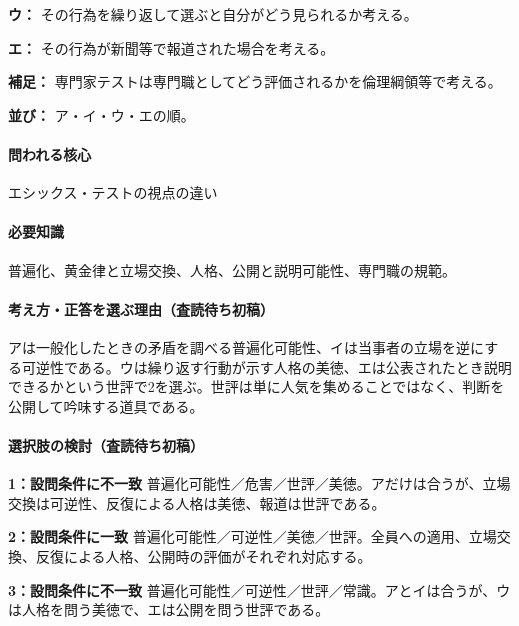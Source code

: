 \noindent\textbf{ウ：} その行為を繰り返して選ぶと自分がどう見られるか考える。\par

\noindent\textbf{エ：} その行為が新聞等で報道された場合を考える。\par

\noindent\textbf{補足：} 専門家テストは専門職としてどう評価されるかを倫理綱領等で考える。\par

\noindent\textbf{並び：} ア・イ・ウ・エの順。\par

\paragraph{問われる核心} エシックス・テストの視点の違い

\paragraph{必要知識} 普遍化、黄金律と立場交換、人格、公開と説明可能性、専門職の規範。

\paragraph{考え方・正答を選ぶ理由（査読待ち初稿）} アは一般化したときの矛盾を調べる普遍化可能性、イは当事者の立場を逆にする可逆性である。ウは繰り返す行動が示す人格の美徳、エは公表されたとき説明できるかという世評で2を選ぶ。世評は単に人気を集めることではなく、判断を公開して吟味する道具である。

\paragraph{選択肢の検討（査読待ち初稿）}\mbox{}\par

\noindent\textbf{1：設問条件に不一致} 普遍化可能性／危害／世評／美徳。アだけは合うが、立場交換は可逆性、反復による人格は美徳、報道は世評である。\par

\noindent\textbf{2：設問条件に一致} 普遍化可能性／可逆性／美徳／世評。全員への適用、立場交換、反復による人格、公開時の評価がそれぞれ対応する。\par

\noindent\textbf{3：設問条件に不一致} 普遍化可能性／可逆性／世評／常識。アとイは合うが、ウは人格を問う美徳で、エは公開を問う世評である。\par

